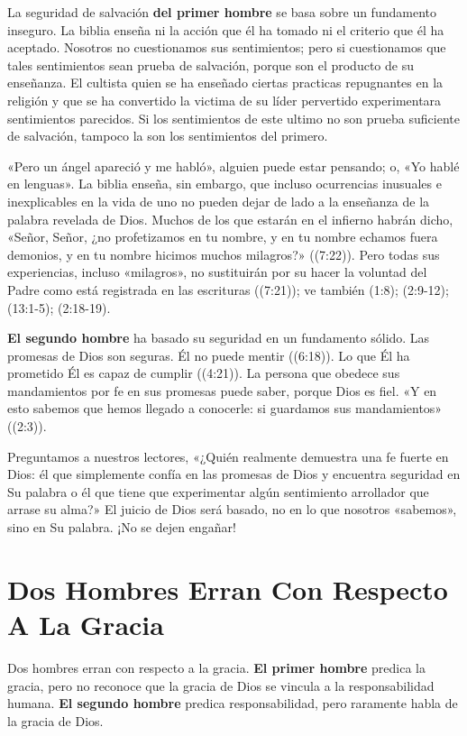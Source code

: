 \documentclass[12pt, twoside, openright]{book}
\begin{document}
La seguridad de salvación \textbf{del primer hombre} se basa sobre un fundamento inseguro. La biblia enseña ni la acción que él ha tomado ni el criterio que él ha aceptado. Nosotros no cuestionamos sus sentimientos; pero si cuestionamos que tales sentimientos sean prueba de salvación, porque son el producto de su enseñanza. El cultista quien se ha enseñado ciertas practicas repugnantes en la religión y que se ha convertido la victima de su líder pervertido experimentara sentimientos parecidos. Si los sentimientos de este ultimo no son prueba suficiente de salvación, tampoco la son los sentimientos del primero.

«Pero un ángel apareció y me habló», alguien puede estar pensando; o, «Yo hablé en lenguas». La biblia enseña, sin embargo, que incluso ocurrencias inusuales e inexplicables en la vida de uno no pueden dejar de lado a la enseñanza de la palabra revelada de Dios. Muchos de los que estarán en el infierno habrán dicho, «Señor, Señor, ¿no profetizamos en tu nombre, y en tu nombre echamos fuera demonios, y en tu nombre hicimos muchos milagros?» ((7:22)). Pero todas sus experiencias, incluso «milagros», no sustituirán por su hacer la voluntad del Padre como est\'a registrada en las escrituras ((7:21)); ve también (1:8); (2:9-12); (13:1-5); (2:18-19).

\textbf{El segundo hombre} ha basado su seguridad en un fundamento sólido. Las promesas de Dios son seguras. Él no puede mentir ((6:18)). Lo que Él ha prometido Él es capaz de cumplir ((4:21)). La persona que obedece sus mandamientos por fe en sus promesas puede saber, porque Dios es fiel. «Y en esto sabemos que hemos llegado a conocerle: si guardamos sus mandamientos» ((2:3)).

Preguntamos a nuestros lectores, «¿Quién realmente demuestra una fe fuerte en Dios: él que simplemente confía en las promesas de Dios y encuentra seguridad en Su palabra o él que tiene que experimentar algún sentimiento arrollador que arrase su alma?» El juicio de Dios será basado, no en lo que nosotros «sabemos», sino en Su palabra. ¡No se dejen engañar!

\section{Dos Hombres Erran Con Respecto A La Gracia}
Dos hombres erran con respecto a la gracia. \textbf{El primer hombre} predica la gracia, pero no reconoce que la gracia de Dios se vincula a la responsabilidad humana. \textbf{El segundo hombre} predica responsabilidad, pero raramente habla de la gracia de Dios. 
\end{document}
